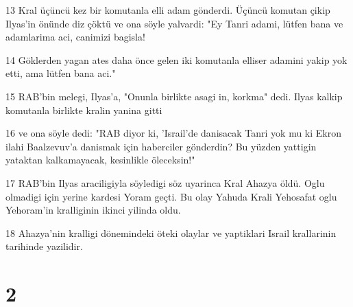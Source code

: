 \par 13 Kral üçüncü kez bir komutanla elli adam gönderdi. Üçüncü komutan çikip Ilyas'in önünde diz çöktü ve ona söyle yalvardi: "Ey Tanri adami, lütfen bana ve adamlarima aci, canimizi bagisla!
\par 14 Göklerden yagan ates daha önce gelen iki komutanla elliser adamini yakip yok etti, ama lütfen bana aci."
\par 15 RAB'bin melegi, Ilyas'a, "Onunla birlikte asagi in, korkma" dedi. Ilyas kalkip komutanla birlikte kralin yanina gitti
\par 16 ve ona söyle dedi: "RAB diyor ki, 'Israil'de danisacak Tanri yok mu ki Ekron ilahi Baalzevuv'a danismak için haberciler gönderdin? Bu yüzden yattigin yataktan kalkamayacak, kesinlikle öleceksin!"
\par 17 RAB'bin Ilyas araciligiyla söyledigi söz uyarinca Kral Ahazya öldü. Oglu olmadigi için yerine kardesi Yoram geçti. Bu olay Yahuda Krali Yehosafat oglu Yehoram'in kralliginin ikinci yilinda oldu.
\par 18 Ahazya'nin kralligi dönemindeki öteki olaylar ve yaptiklari Israil krallarinin tarihinde yazilidir.

\chapter{2}

